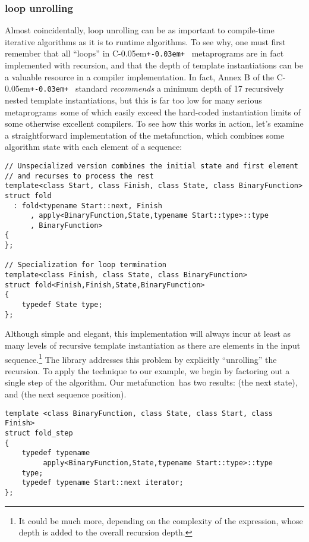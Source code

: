\documentclass{netobjectdays}
\newcommand{\Cpp}{C\kern-0.05em\texttt{+\kern-0.03em+}%
}
\newcommand{\mpgms}{meta\-programs}
\newcommand{\mfn}{meta\-function}
\begin{document}
  \subsubsection{loop unrolling}

Almost coincidentally, loop unrolling can be as important to
compile-time iterative algorithms as it is to runtime algorithms. To
see why, one must first remember that all ``loops'' in \Cpp\
metaprograms are in fact implemented with recursion, and that the
depth of template instantiations can be a valuable resource in a
compiler implementation. In fact, Annex B of the \Cpp\ standard
\emph{recommends} a minimum depth of 17 recursively nested template
instantiations, but this is far too low for many serious \mpgms\ some
of which easily exceed the hard-coded instantiation limits of some
otherwise excellent compilers. To see how this works in action, let's
examine a straightforward implementation of the \code{fold} \mfn,
which combines some algorithm state with each element of a sequence:

{\footnotesize
\begin{verbatim}
// Unspecialized version combines the initial state and first element
// and recurses to process the rest
template<class Start, class Finish, class State, class BinaryFunction>
struct fold
  : fold<typename Start::next, Finish
      , apply<BinaryFunction,State,typename Start::type>::type
      , BinaryFunction>
{
};

// Specialization for loop termination
template<class Finish, class State, class BinaryFunction>
struct fold<Finish,Finish,State,BinaryFunction>
{
    typedef State type;
};
\end{verbatim}
}

Although simple and elegant, this implementation will always incur at
least as many levels of recursive template instantiation as there are
elements in the input sequence.\footnote{It could be much more,
depending on the complexity of the  expression, whose
depth is added to the overall recursion depth.} The library addresses
this problem by explicitly ``unrolling'' the recursion. To apply the
technique to our \code{fold} example, we begin by factoring out a
single step of the algorithm. Our \code{fold\_\-step} \mfn\ has two
results: \code{type} (the next state), and \code{iterator} (the next sequence position).

{\footnotesize
\begin{verbatim}
template <class BinaryFunction, class State, class Start, class Finish>
struct fold_step
{
    typedef typename
         apply<BinaryFunction,State,typename Start::type>::type
    type;
    typedef typename Start::next iterator;
};
\end{verbatim}
}
\end{document}
